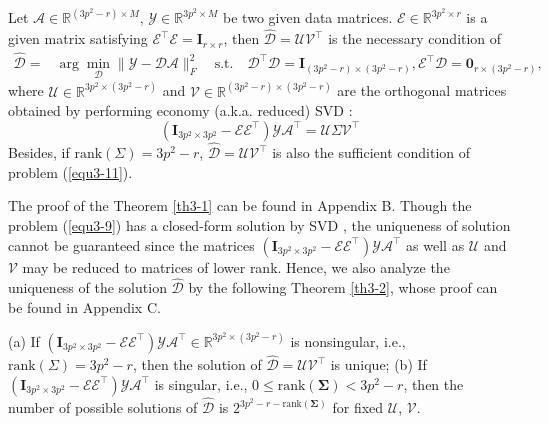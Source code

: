 \begin{theorem}
\label{th3-1}
Let $\mathcal{A}\in \mathbb{R}^{(3p^2-r)\times M}$, $\mathcal{Y}\in \mathbb{R}^{3p^2\times M}$ be two given data matrices. $\mathcal{E}\in\mathbb{R}^{3p^2\times r}$ is a given matrix satisfying $\mathcal{E}^{\top}\mathcal{E}=\bm{I}_{r\times r}$, then $\hat{\mathcal{D}} = \mathcal{U}\mathcal{V}^{\top}$ is the necessary condition of
\begin{equation}\label{equ3-11}
\begin{split}
\hat{\mathcal{D}}
=
&
\arg\min_{\mathcal{D}}\|\mathcal{Y}-\mathcal{D}\mathcal{A}\|_{F}^{2}
\quad
\text{s.t.}
\quad
\mathcal{D}^{\top}\mathcal{D} = \bm{I}_{(3p^2-r)\times (3p^2-r)}, \mathcal{E}^{\top}\mathcal{D} = \bm{0}_{r\times (3p^2-r)}
,
\end{split}
\end{equation}
where $\mathcal{U}\in \mathbb{R}^{3p^2\times (3p^2-r)}$ and $\mathcal{V}\in \mathbb{R}^{(3p^2-r)\times (3p^2-r)}$ are the orthogonal matrices obtained by performing economy (a.k.a. reduced) SVD  \cite{eckart1936approximation}:
\begin{equation}\label{equ3-12}
(\bm{I}_{3p^2\times 3p^2}-\mathcal{E}\mathcal{E}^{\top})\mathcal{Y}\mathcal{A}^{\top} = \mathcal{U}\Sigma\mathcal{V}^{\top}
\end{equation}
Besides, if $\text{rank}(\Sigma)=3p^2-r$, $\hat{\mathcal{D}} = \mathcal{U}\mathcal{V}^{\top}$ is also the sufficient condition of problem (\ref{equ3-11}). 
\end{theorem}


The proof of the Theorem \ref{th3-1} can be found in Appendix B. Though the problem (\ref{equ3-9}) has a closed-form solution by SVD \cite{eckart1936approximation}, the uniqueness of solution cannot be guaranteed since the matrices $(\bm{I}_{3p^2\times 3p^2}-\mathcal{E}\mathcal{E}^{\top})\mathcal{Y}\mathcal{A}^{\top}$ as well as $\mathcal{U}$ and $\mathcal{V}$ may be reduced to matrices of lower rank. Hence, we also analyze the uniqueness of the solution $\hat{\mathcal{D}}$ by the following Theorem \ref{th3-2}, whose proof can be found in Appendix C.

\begin{theorem}
\label{th3-2}
(a) If $(\bm{I}_{3p^2\times 3p^2}-\mathcal{E}\mathcal{E}^{\top})\mathcal{Y}\mathcal{A}^{\top}\in\mathbb{R}^{3p^2\times (3p^2-r)}$ is nonsingular, i.e., $\text{rank}(\Sigma)=3p^2-r$, then the solution of $\hat{\mathcal{D}}=\mathcal{U}\mathcal{V}^{\top}$ is unique; (b) If $(\bm{I}_{3p^2\times 3p^2}-\mathcal{E}\mathcal{E}^{\top})\mathcal{Y}\mathcal{A}^{\top}$ is singular, i.e., $0\le\text{rank}(\bm{\Sigma})< 3p^2-r$, then the number of possible solutions of $\hat{\mathcal{D}}$ is $2^{3p^2-r-\text{rank}(\bm{\Sigma})}$ for fixed $\mathcal{U}$, $\mathcal{V}$.
\end{theorem}

